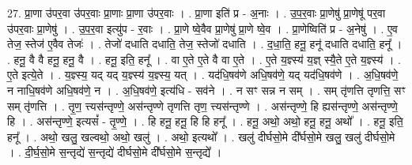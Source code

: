 \documentclass[17pt]{extarticle}
\begin{document}
27. प्रा॒णा उ॑पर॒वा उ॑पर॒वाः प्रा॒णाः प्रा॒णा उ॑पर॒वाः । . प्रा॒णा इति॑ प्र - अ॒नाः । . उ॒प॒र॒वाः प्रा॒णेषु॑ प्रा॒णेषू॑ पर॒वा उ॑पर॒वाः प्रा॒णेषु॑ । . उ॒प॒र॒वा इत्यु॑प - र॒वाः । . प्रा॒णे ष्वे॒वैव प्रा॒णेषु॑ प्रा॒णे ष्वे॒व । . प्रा॒णेष्विति॑ प्र - अ॒नेषु॑ । . ए॒व तेज॒ स्तेज॑ ए॒वैव तेजः॑ । . तेजो॑ दधाति दधाति॒ तेज॒ स्तेजो॑ दधाति । . द॒धा॒ति॒ हनू॒ हनू॑ दधाति दधाति॒ हनू᳚ । . हनू॒ वै वै हनू॒ हनू॒ वै । . हनू॒ इति॒ हनू᳚ । . वा ए॒ते ए॒ते वै वा ए॒ते । . ए॒ते य॒ज्ञ्स्य॑ य॒ज्ञ् स्यै॒ते ए॒ते य॒ज्ञ्स्य॑ । . ए॒ते इत्ये॒ते । . य॒ज्ञ्स्य॒ यद् यद् य॒ज्ञ्स्य॑ य॒ज्ञ्स्य॒ यत् । . यद॑धि॒षव॑णे अधि॒षव॑णे॒ यद् यद॑धि॒षव॑णे । . अ॒धि॒षव॑णे॒ न नाधि॒षव॑णे अधि॒षव॑णे॒ न । . अ॒धि॒षव॑णे॒ इत्य॑धि - सव॑ने । . न सꣳ सन्न न सम् । . सम् तृ॑णत्ति तृणत्ति॒ सꣳ सम् तृ॑णत्ति । . तृ॒ण॒ त्त्यस॑न्तृण्णे॒ अस॑न्तृण्णे तृणत्ति तृण॒ त्त्यस॑न्तृण्णे । . अस॑न्तृण्णे॒ हि ह्यस॑न्तृण्णे॒ अस॑न्तृण्णे॒ हि । . अस॑न्तृण्णे॒ इत्यसं᳚ - तृ॒ण्णे॒ । . हि हनू॒ हनू॒ हि हि हनू᳚ । . हनू॒ अथो॒ अथो॒ हनू॒ हनू॒ अथो᳚ । . हनू॒ इति॒ हनू᳚ । . अथो॒ खलु॒ खल्वथो॒ अथो॒ खलु॑ । . अथो॒ इत्यथो᳚ । . खलु॑ दीर्घसो॒मे दी᳚र्घसो॒मे खलु॒ खलु॑ दीर्घसो॒मे । . दी॒र्घ॒सो॒मे स॒न्तृद्ये॑ स॒न्तृद्ये॑ दीर्घसो॒मे दी᳚र्घसो॒मे स॒न्तृद्ये᳚ । \newline
\end{document}
